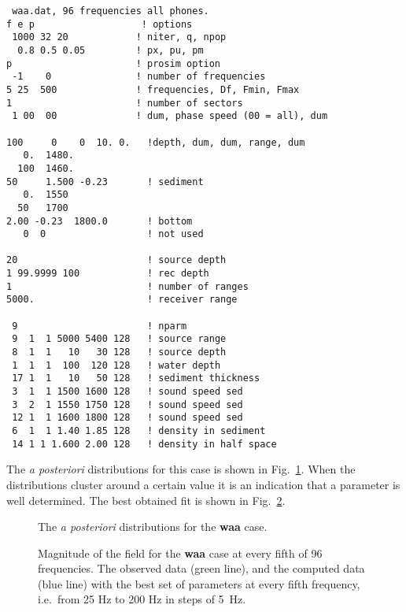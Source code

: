 \documentclass{saclantc}
\begin{document}
\small
\begin{verbatim}
 waa.dat, 96 frequencies all phones.
f e p                   ! options 
 1000 32 20            ! niter, q, npop
  0.8 0.5 0.05         ! px, pu, pm
p                      ! prosim option
 -1    0               ! number of frequencies
5 25  500              ! frequencies, Df, Fmin, Fmax
1                      ! number of sectors
 1 00  00              ! dum, phase speed (00 = all), dum

100     0    0  10. 0.   !depth, dum, dum, range, dum
   0.  1480.     
  100  1460.
50     1.500 -0.23       ! sediment
   0.  1550
  50   1700 
2.00 -0.23  1800.0       ! bottom
   0  0                  ! not used

20                       ! source depth
1 99.9999 100            ! rec depth
1                        ! number of ranges
5000.                    ! receiver range

 9                       ! nparm                 
 9  1  1 5000 5400 128   ! source range         
 8  1  1   10   30 128   ! source depth           
 1  1  1  100  120 128   ! water depth
 17 1  1   10   50 128   ! sediment thickness
 3  1  1 1500 1600 128   ! sound speed sed 
 3  2  1 1550 1750 128   ! sound speed sed 
 12 1  1 1600 1800 128   ! sound speed sed
 6  1  1 1.40 1.85 128   ! density in sediment
 14 1 1 1.600 2.00 128   ! density in half space
\end{verbatim}
\normalsize

The {\it a posteriori} distributions for this case is shown in Fig.\
\ref{fig:waa_ppd}. When the distributions cluster around a
certain value it is an indication that a parameter is well determined.
%
The best obtained fit is shown in Fig.\ \ref{fig:waa_fit}.

\begin{figure}
\epsfxsize=10cm
\centerline{}
\caption{The {\it a posteriori} distributions for the {\bf waa} case. }
\label{fig:waa_ppd}
\end{figure}


\begin{figure}
\epsfxsize=13cm
\centerline{}
\caption{Magnitude of the field for the {\bf waa} case at every fifth of 96
frequencies. 
The observed data (green line), and the
computed data (blue line) with  the best set of parameters at every
fifth frequency, i.e.\ from 25 Hz to 200 Hz in steps of 5~Hz. 
} 
\label{fig:waa_fit}
\end{figure}
\end{document}
